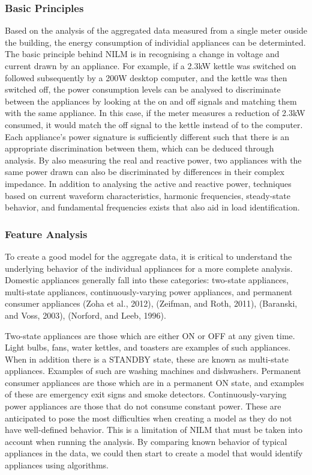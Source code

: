 \documentclass[11pt,twocolumn]{article}
\begin{document}
			\subsubsection*{Basic Principles}
			Based on the analysis of the aggregated data measured from a single meter ouside the building, the energy consumption of individial appliances can be determinted. The basic principle behind NILM is in recognising a change in voltage and current drawn by an appliance. For example, if a 2.3kW kettle was switched on followed subsequently by a 200W desktop computer, and the kettle was then switched off, the power consumption levels can be analysed to discriminate between the appliances by looking at the on and off signals and matching them with the same appliance. In this case, if the meter measures a reduction of 2.3kW consumed, it would match the off signal to the kettle instead of to the computer. Each appliance's power signature is sufficiently different such that there is an appropriate discrimination between them, which can be deduced through analysis. By also measuring the real and reactive power, two appliances with the same power drawn can also be discriminated by differences in their complex impedance. In addition to analysing the active and reactive power, techniques based on current waveform characteristics, harmonic frequencies, steady-state behavior, and fundamental frequencies exists that also aid in load identification. 

			\subsubsection*{Feature Analysis}
			To create a good model for the aggregate data, it is critical to understand the underlying behavior of the individual appliances for a more complete analysis. Domestic appliances generally fall into these categories: two-state appliances, multi-state appliances, continuously-varying power appliances, and permanent consumer appliances (Zoha et al., 2012), (Zeifman, and Roth, 2011), (Baranski, and Voss, 2003), (Norford, and Leeb, 1996).

			Two-state appliances are those which are either ON or OFF at any given time. Light bulbs, fans, water kettles, and toasters are examples of such appliances. When in addition there is a STANDBY state, these are known as multi-state appliances. Examples of such are washing machines and dishwashers. Permanent consumer appliances are those which are in a permanent ON state, and examples of these are emergency exit signs and smoke detectors. Continuously-varying power appliances are those that do not consume constant power. These are anticipated to pose the most difficulties when creating a model as they do not have well-defined behavior. This is a limitation of NILM that must be taken into account when running the analysis. By comparing known behavior of typical appliances in the data, we could then start to create a model that would identify appliances using algorithms.
			
\end{document}
